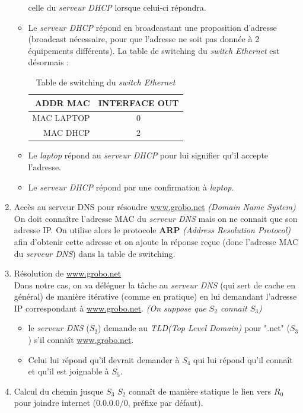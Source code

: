 \documentclass{article}
\newcommand{\titre}[1]{\textcolor{title}{#1}}
\newcommand{\term}[1]{\textit{\textcolor{maintitle}{#1}}}
\begin{document}
\begin{sffamily}
\begin{enumerate}
\begin{itemize}
celle du \term{serveur DHCP} lorsque celui-ci répondra.
\item Le \term{serveur DHCP} répond en broadcastant une proposition d'adresse (broadcast nécessaire, pour que l'adresse ne soit 
pas donnée à 2 équipements différents). La table de switching du \term{switch Ethernet} est désormais :
\begin{table}[h!]
	\begin{center}
	\begin{tabular}{|rc|}
	ADDR MAC & INTERFACE OUT\\
	\hline
	MAC LAPTOP & 0 \\
	MAC DHCP & 2
	\end{tabular}
	\caption{Table de switching du \term{switch Ethernet}}
	\end{center}
\end{table}
\item Le \textit{laptop} répond au \term{serveur DHCP} pour lui signifier qu'il accepte l'adresse.
\item Le \term{serveur DHCP} répond par une confirmation à \textit{laptop}.
\end{itemize}
\item \titre{Accès au serveur DNS pour résoudre \url{www.grobo.net}} \textit{(Domain Name System)} \\
On doit connaître l'adresse MAC du \term{serveur DNS} mais on ne connait que son adresse IP. On utilise alors le protocole 
\textbf{ARP} \textit{(Address Resolution Protocol)} afin d'obtenir cette adresse et on ajoute la réponse reçue (donc l'adresse 
MAC du \term{serveur DNS}) dans la table de switching.
\item \titre{Résolution de \url{www.grobo.net}}\\
Dans notre cas, on va déléguer la tâche au \term{serveur DNS} (qui sert de cache en général) de manière itérative (comme en 
pratique) en lui demandant l'adresse IP correspondant à \url{www.grobo.net}. \textit{(On suppose que $S_2$ connait $S_3$)}
\begin{itemize}
\item le \term{serveur DNS} ($S_2$) demande au \term{TLD}\textit{(Top Level Domain)} pour ".net" ($S_3$) s'il connaît 
\url{www.grobo.net}.
\item Celui lui répond qu'il devrait demander à $S_4$ qui lui répond qu'il connaît et qu'il est joignable à $S_5$.
\end{itemize}
\item \titre{Calcul du chemin jusque $S_3$}
$S_2$ connaît de manière statique le lien vers $R_0$ pour joindre internet ($0.0.0.0/0$, préfixe par défaut).

\end{enumerate}
\end{sffamily}
\end{document}
